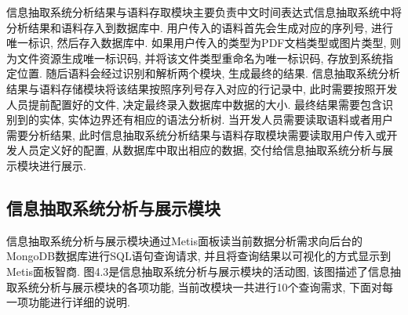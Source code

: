 信息抽取系统分析结果与语料存取模块主要负责中文时间表达式信息抽取系统中将分析结果和语料存入到数据库中.
用户传入的语料首先会生成对应的序列号, 进行唯一标识, 然后存入数据库中.
如果用户传入的类型为PDF文档类型或图片类型, 则为文件资源生成唯一标识码, 并将该文件类型重命名为唯一标识码, 存放到系统指定位置.
随后语料会经过识别和解析两个模块, 生成最终的结果.
信息抽取系统分析结果与语料存储模块将该结果按照序列号存入对应的行记录中, 此时需要按照开发人员提前配置好的文件, 决定最终录入数据库中数据的大小.
最终结果需要包含识别到的实体, 实体边界还有相应的语法分析树.
当开发人员需要读取语料或者用户需要分析结果, 此时信息抽取系统分析结果与语料存取模块需要读取用户传入或开发人员定义好的配置, 从数据库中取出相应的数据,
交付给信息抽取系统分析与展示模块进行展示.

\subsection{信息抽取系统分析与展示模块}

信息抽取系统分析与展示模块通过Metis面板读当前数据分析需求向后台的MongoDB数据库进行SQL语句查询请求, 并且将查询结果以可视化的方式显示到Metis面板智商.
图4.3是信息抽取系统分析与展示模块的活动图, 该图描述了信息抽取系统分析与展示模块的各项功能, 当前改模块一共进行10个查询需求, 下面对每一项功能进行详细的说明.

